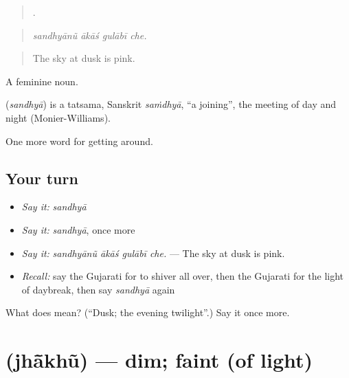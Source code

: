 \begin{quote}
   .
\end{quote}

\begin{quote}
\emph{sandhyānũ ākāś gulābī che.}
\end{quote}

\begin{quote}
The sky at dusk is pink.
\end{quote}

A feminine noun.

\begin{cousinweb}
\textbf{} (\emph{sandhyā}) is a tatsama, Sanskrit \emph{saṁdhyā}, \textquotedblleft{}a joining\textquotedblright{}, the meeting of day and night (Monier-Williams).
\end{cousinweb}

\begin{grammarlens}[title={What you've built}]
One more word for getting around.
\end{grammarlens}

\subsection*{Your turn}
\begin{itemize}
\raggedright
  \item \emph{Say it:} \emph{sandhyā}
  \item \emph{Say it:} \emph{sandhyā}, once more
  \item \emph{Say it:} \emph{sandhyānũ ākāś gulābī che.} — The sky at dusk is pink.
  \item \emph{Recall:} say the Gujarati for to shiver all over, then the Gujarati for the light of daybreak, then say \emph{sandhyā} again
\end{itemize}

\begin{tcolorbox}[breakable,colback=teal!4,colframe=teal!35!black,title={Before you move on}]
What does  mean? (\textquotedblleft{}Dusk; the evening twilight\textquotedblright{}.) Say it once more.
\end{tcolorbox}
\section[\texorpdfstring{\gu{ઝાંખું} (jhā̃khũ)}{ઝાંખું (jhā̃khũ)}]{ (jhā̃khũ) — dim; faint (of light)}

\label{lesson:GU-C438-jhakhu}



